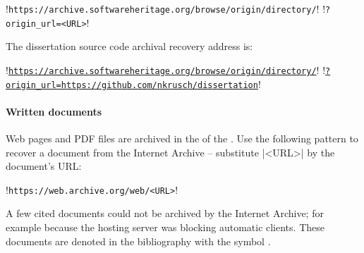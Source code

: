 \noindent\begin{minipage}{\textwidth}
\begin{browserlisting}
!\texttt{https://archive.softwareheritage.org/browse/origin/directory/}!
!\hspace{2em}\texttt{?origin\_url=<URL>}!
\end{browserlisting}
\end{minipage}

\begin{example}
The dissertation source code archival recovery address is:\mbox{}

\noindent\begin{minipage}{\textwidth}
\begin{browserlisting}
!\texttt{\href{https://archive.softwareheritage.org/browse/origin/directory/?origin_url=https://github.com/nkrusch/dissertation}{https://archive.softwareheritage.org/browse/origin/directory/}}!
!\hspace{2em}\texttt{\href{https://archive.softwareheritage.org/browse/origin/directory/?origin_url=https://github.com/nkrusch/dissertation}{?origin\_url=https://github.com/nkrusch/dissertation}}!
\end{browserlisting}
\end{minipage}
\end{example}

\paragraph*{Written documents}
Web pages and PDF files are archived in the  of the
. Use the following pattern to recover a document from the
Internet Archive -- substitute \pr|<URL>| by the document's URL\@:

\noindent\begin{minipage}{\textwidth}
\begin{browserlisting}
!\texttt{https://web.archive.org/web/<URL>}!
\end{browserlisting}
\end{minipage}

A few cited documents could not be archived by the Internet Archive; for example
because the hosting server was blocking automatic clients. These documents
are denoted in the bibliography with the symbol \textdagger.

